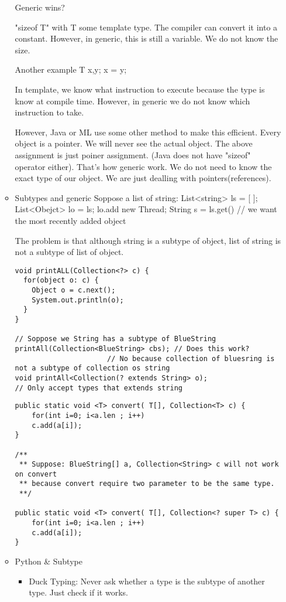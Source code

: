 \documentclass[11pt]{article}
\begin{document}
\begin{itemize}
\begin{itemize}
Generic wins?

"sizeof T" with T some template type. The compiler can convert it into a
constant. However, in generic, this is still a variable. We do not know
the size.

Another example
T x,y;
x = y;

In template, we know what instruction to execute because the type is know
at compile time. However, in generic we do not know which instruction to
take. 

However, Java or ML use some other method to make this efficient. Every
object is a pointer. We will never see the actual object. The above
assignment is just poiner assignment. (Java does not have "sizeof"
operator either). That's how generic work. We do not need to know the
exact type of our object. We are just dealling with pointers(references).

\item Subtypes and generic
Soppose a list of string:
List<string> ls = [                  ];
List<Obejct> lo = ls;
lo.add new Thread;
String s = ls.get() // we want the most recently added object

The problem is that although string is a subtype of object, list of
string is not a subtype of list of object.

\begin{verbatim}
void printALL(Collection<?> c) {
  for(object o: c) {
    Object o = c.next();
    System.out.println(o);
  }
}

// Soppose we String has a subtype of BlueString
printAll(Collection<BlueString> cbs); // Does this work?
				      // No because collection of bluesring is not a subtype of collection os string
void printAll<Collection(? extends String> o);
// Only accept types that extends string
\end{verbatim}
\begin{verbatim}
public static void <T> convert( T[], Collection<T> c) {
    for(int i=0; i<a.len ; i++)
    c.add(a[i]);
}

/**
 ** Suppose: BlueString[] a, Collection<String> c will not work on convert
 ** because convert require two parameter to be the same type.
 **/

public static void <T> convert( T[], Collection<? super T> c) {
    for(int i=0; i<a.len ; i++)
    c.add(a[i]);
}
\end{verbatim}

\item Python \& Subtype
\begin{itemize}
\item Duck Typing: 
Never ask whether a type is the subtype of another type. Just check if
it works.
\end{itemize}
\end{itemize}
\end{itemize}
\end{document}
